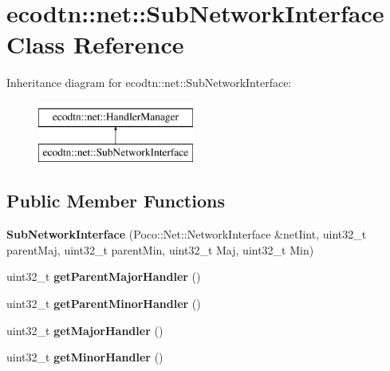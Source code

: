 \hypertarget{classecodtn_1_1net_1_1SubNetworkInterface}{}\section{ecodtn\+:\+:net\+:\+:Sub\+Network\+Interface Class Reference}
\label{classecodtn_1_1net_1_1SubNetworkInterface}
Inheritance diagram for ecodtn\+:\+:net\+:\+:Sub\+Network\+Interface\+:\begin{figure}[H]
\begin{center}
\leavevmode
\includegraphics[height=2.000000cm]{classecodtn_1_1net_1_1SubNetworkInterface}
\end{center}
\end{figure}
\subsection*{Public Member Functions}
\begin{DoxyCompactItemize}
\item 
\mbox{\label{classecodtn_1_1net_1_1SubNetworkInterface_aa699594b4f7c5efa16dae5b886470964}} 
{\bfseries Sub\+Network\+Interface} (Poco\+::\+Net\+::\+Network\+Interface \&net\+Iint, uint32\+\_\+t parent\+Maj, uint32\+\_\+t parent\+Min, uint32\+\_\+t Maj, uint32\+\_\+t Min)
\item 
\mbox{\label{classecodtn_1_1net_1_1SubNetworkInterface_af3d6572ceb34a646fd95acb016b5be9e}} 
uint32\+\_\+t {\bfseries get\+Parent\+Major\+Handler} ()
\item 
\mbox{\label{classecodtn_1_1net_1_1SubNetworkInterface_a070ab52515830cdca9414d1513385e24}} 
uint32\+\_\+t {\bfseries get\+Parent\+Minor\+Handler} ()
\item 
\mbox{\label{classecodtn_1_1net_1_1SubNetworkInterface_a9f26ab2925d97e352e56f8fe79b10d11}} 
uint32\+\_\+t {\bfseries get\+Major\+Handler} ()
\item 
\mbox{\label{classecodtn_1_1net_1_1SubNetworkInterface_a8fea16041f9fa6589c1b8cde56cc260e}} 
uint32\+\_\+t {\bfseries get\+Minor\+Handler} ()
\end{DoxyCompactItemize}
